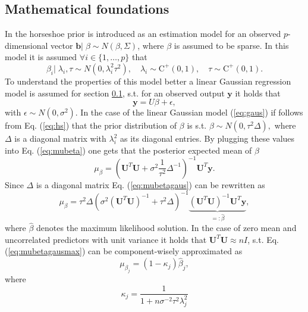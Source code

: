 \documentclass[12pt,letterpaper]{article}
\numberwithin{equation}{subsection}
\begin{document}
\subsection{Mathematical foundations}
\label{sec:mfound}
In \cite{horseshoe} the horseshoe prior is introduced as an estimation model for an observed $p$-dimensional vector $\mathbf{b}|\; \beta \sim N(\beta, \Sigma)$, where $\beta$ is assumed to be sparse.
In this model it is assumed $\forall i \in \{1,\dots,p\}$ that
\begin{equation}
\beta_i |\; \lambda_i, \tau \sim N(0,\lambda^2_i\tau^2),\quad \lambda_i \sim \text{C}^+(0, 1), \quad \tau \sim  \text{C}^+(0, 1).
\label{eq:hs}
\end{equation}
To understand the properties of this model better a linear Gaussian regression model is assumed for section \ref{sec:mfound}, s.t. for an observed output $\mathbf{y}$ it holds that 
\begin{equation}
\mathbf{y} = U\beta + \epsilon,
\label{eq:gaus}
\end{equation}
with $\epsilon \sim N(0,\sigma^2)$.
In the case of the linear Gaussian model (\ref{eq:gaus}) if follows from Eq. (\ref{eq:hs}) that the prior distribution of $\beta$ is s.t. $\beta \sim N(0, \tau^2\Delta), $ where $\Delta$ is a diagonal matrix with $\lambda_i^2$ as its diagonal entries. By plugging these values into Eq. (\ref{eq:mubeta}) one gets that the posterior expected mean of $\beta$
\begin{equation}
\mu_\beta = (\mathbf{U}^T\mathbf{U} + \sigma^2 \frac{1}{\tau^2}\Delta^{-1})^{-1}\mathbf{U}^T\mathbf{y}.
\label{eq:mubetagaus}
\end{equation}
Since $\Delta$ is a diagonal matrix Eq. (\ref{eq:mubetagaus}) can be rewritten as 
\begin{equation}
\mu_\beta = \tau^2\Delta(\sigma^2(\mathbf{U}^T\mathbf{U} )^{-1} + \tau^2\Delta)^{-1}\underbrace{(\mathbf{U}^T\mathbf{U} )^{-1}\mathbf{U}^T\mathbf{y}}_{=:\hat{\beta}},
\label{eq:mubetagausmax}
\end{equation}
where $\hat{\beta}$ denotes the maximum likelihood solution. In the case of zero mean and uncorrelated predictors with unit variance it holds that $\mathbf{U}^T\mathbf{U} \approx nI$, s.t. Eq. (\ref{eq:mubetagausmax}) can be component-wisely approximated as 
\begin{equation}
\mu_{\beta_j} = (1-\kappa_j)\hat{\beta}_j,
\end{equation}
where 
\begin{equation}
\kappa_j = \frac{1}{1+n\sigma^{-2}\tau^2\lambda^2_j}
\label{eq:kappa}
\end{equation}
\end{document}

